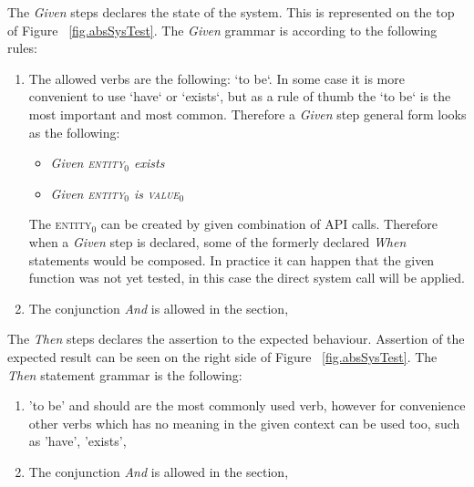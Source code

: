 \documentclass[conference]{IEEEtran}
\begin{document}
The \textit{Given} steps declares the state of the system. This is represented on the top of Figure ~\ref{fig.absSysTest}. The \textit{Given} grammar is according to the following rules:
\begin{enumerate}[label=g.\arabic*]
    \item The allowed verbs are the following: `to be`. In some case it is more convenient to use `have` or `exists`, but as a rule of thumb the `to be` is the most important and most common. Therefore a \textit{Given} step general form looks as the following:
    \begin{itemize}
        \item \textit{Given \textsc{entity\(_{0} \)} exists}
        \item \textit{Given \textsc{entity\(_{0} \)} is \textsc{value\(_{0} \)}}
    \end{itemize}
    The \textsc{entity\(_{0} \)} can be created by given combination of API calls. Therefore when a \textit{Given} step is declared, some of the formerly declared \textit{When} statements would be composed. In practice it can happen that the given function was not yet tested, in this case the direct system call will be applied.
    \item The conjunction \textit{And} is allowed in the  section,
\end{enumerate}

The \textit{Then} steps declares the assertion to the expected behaviour. Assertion of the expected result can be seen on the right side of Figure ~\ref{fig.absSysTest}. The \textit{Then} statement grammar is the following:
\begin{enumerate}[label=t.\arabic*]
    \item 'to be' and should are the most commonly used verb, however for convenience other verbs which has no meaning in the given context can be used too, such as 'have', 'exists',
    \item The conjunction \textit{And} is allowed in the  section,
\end{enumerate}
\end{document}
